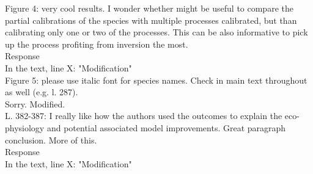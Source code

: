 \documentclass[a4paper, 11pt]{article}
\begin{document}
\noindent Figure 4: very cool results. I wonder whether might be useful to compare the partial calibrations of the species with multiple processes calibrated, but than calibrating only one or two of the processes. This can be also informative to pick up the process profiting from inversion the most.\\
\textcolor{customblue}{Response}\\
In the text, line X: \textcolor{customred}{"Modification"}\\

\noindent Figure 5: please use italic font for species names. Check in main text throughout as well (e.g. l. 287).\\
\textcolor{customblue}{Sorry. Modified.}\\

\noindent L. 382-387: I really like how the authors used the outcomes to explain the eco-physiology and potential associated model improvements. Great paragraph conclusion. More of this.\\
\textcolor{customblue}{Response}\\
In the text, line X: \textcolor{customred}{"Modification"}


\clearpage
\renewcommand\refname{References}

\end{document}
